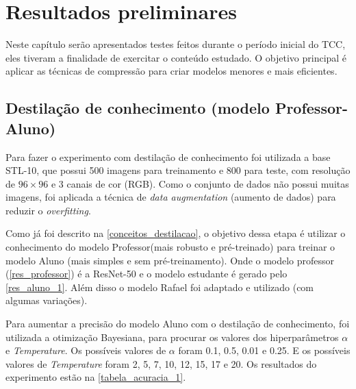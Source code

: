 \chapter{Resultados preliminares}

Neste capítulo serão apresentados testes feitos durante o período inicial do TCC, eles tiveram a finalidade de
exercitar o conteúdo estudado.
O objetivo principal é aplicar as técnicas de compressão para criar modelos menores e mais eficientes.

\section{Destilação de conhecimento (modelo Professor-Aluno)}
Para fazer o experimento com destilação de conhecimento foi utilizada a base STL-10, que possui 500 imagens para
treinamento e 800 para teste, com resolução de $96 \times 96$ e 3 canais de cor (RGB). Como o conjunto de dados
não possui muitas imagens, foi aplicada a técnica de \textit{data augmentation} (aumento de dados) para reduzir o
\textit{overfitting}.

Como já foi descrito na \autoref{conceitos_destilacao}, o objetivo dessa etapa é utilizar o conhecimento do modelo
Professor(mais robusto e pré-treinado) para treinar o modelo Aluno (mais simples e sem pré-treinamento).
Onde o modelo professor (\autoref{res_professor}) é a ResNet-50  \cite{resnet} e o modelo estudante é gerado pelo
\autoref{res_aluno_1}.
Além disso o modelo Rafael \cite{rafael} foi adaptado e utilizado (com algumas variações).

Para aumentar a precisão do modelo Aluno com o destilação de conhecimento, foi utilizada a otimização
Bayesiana, para procurar os valores dos hiperparâmetros $\alpha$ e \textit{Temperature}.
Os possíveis valores de $\alpha$ foram 0.1, 0.5, 0.01 e 0.25.
E os possíveis valores de \textit{Temperature} foram 2, 5, 7, 10, 12, 15, 17 e 20.
Os resultados do experimento estão na \autoref{tabela_acuracia_1}.

